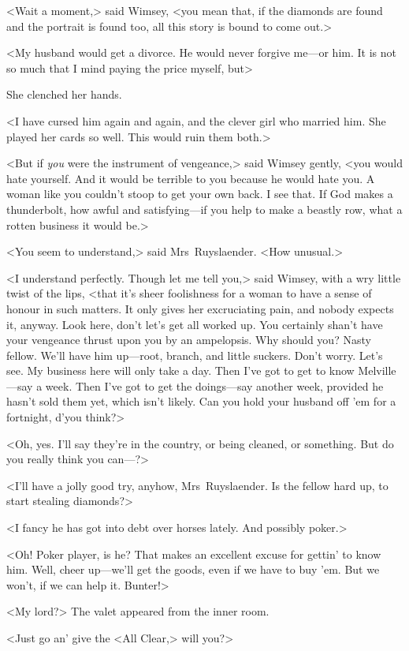 <Wait a moment,> said Wimsey, <you mean that, if the diamonds are found and the portrait is found too, all this story is bound to come out.>

<My husband would get a divorce. He would never forgive me—or him. It is not so much that I mind paying the price myself, but\longdash>

She clenched her hands.

<I have cursed him again and again, and the clever girl who married him. She played her cards so well. This would ruin them both.>

<But if \emph{you} were the instrument of vengeance,> said Wimsey gently, <you would hate yourself. And it would be terrible to you because he would hate you. A woman like you couldn't stoop to get your own back. I see that. If God makes a thunderbolt, how awful and satisfying—if you help to make a beastly row, what a rotten business it would be.>

<You seem to understand,> said Mrs~Ruyslaender. <How unusual.>

<I understand perfectly. Though let me tell you,> said Wimsey, with a wry little twist of the lips, <that it's sheer foolishness for a woman to have a sense of honour in such matters. It only gives her excruciating pain, and nobody expects it, anyway. Look here, don't let's get all worked up. You certainly shan't have your vengeance thrust upon you by an ampelopsis. Why should you? Nasty fellow. We'll have him up—root, branch, and little suckers. Don't worry. Let's see. My business here will only take a day. Then I've got to get to know Melville—say a week. Then I've got to get the doings—say another week, provided he hasn't sold them yet, which isn't likely. Can you hold your husband off 'em for a fortnight, d'you think?>

<Oh, yes. I'll say they're in the country, or being cleaned, or something. But do you really think you can—?>

<I'll have a jolly good try, anyhow, Mrs~Ruyslaender. Is the fellow hard up, to start stealing diamonds?>

<I fancy he has got into debt over horses lately. And possibly poker.>

<Oh! Poker player, is he? That makes an excellent excuse for gettin' to know him. Well, cheer up—we'll get the goods, even if we have to buy 'em. But we won't, if we can help it. Bunter!>

<My lord?> The valet appeared from the inner room.

<Just go an' give the <All Clear,> will you?>

